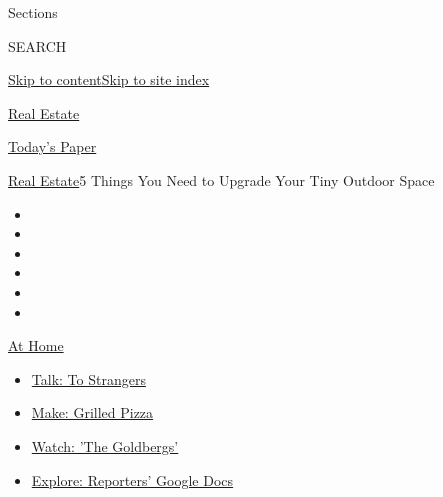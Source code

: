 Sections

SEARCH

\protect\hyperlink{site-content}{Skip to
content}\protect\hyperlink{site-index}{Skip to site index}

\href{https://www.nytimes3xbfgragh.onion/section/realestate}{Real
Estate}

\href{https://myaccount.nytimes3xbfgragh.onion/auth/login?response_type=cookie\&client_id=vi}{}

\href{https://www.nytimes3xbfgragh.onion/section/todayspaper}{Today's
Paper}

\href{/section/realestate}{Real Estate}\textbar{}5 Things You Need to
Upgrade Your Tiny Outdoor Space

\begin{itemize}
\item
\item
\item
\item
\item
\item
\end{itemize}

\href{https://www.nytimes3xbfgragh.onion/spotlight/at-home?action=click\&pgtype=Article\&state=default\&region=TOP_BANNER\&context=at_home_menu}{At
Home}

\begin{itemize}
\tightlist
\item
  \href{https://www.nytimes3xbfgragh.onion/2020/08/03/well/family/the-benefits-of-talking-to-strangers.html?action=click\&pgtype=Article\&state=default\&region=TOP_BANNER\&context=at_home_menu}{Talk:
  To Strangers}
\item
  \href{https://www.nytimes3xbfgragh.onion/2020/08/01/at-home/coronavirus-make-pizza-on-a-grill.html?action=click\&pgtype=Article\&state=default\&region=TOP_BANNER\&context=at_home_menu}{Make:
  Grilled Pizza}
\item
  \href{https://www.nytimes3xbfgragh.onion/2020/07/31/arts/television/goldbergs-abc-stream.html?action=click\&pgtype=Article\&state=default\&region=TOP_BANNER\&context=at_home_menu}{Watch:
  'The Goldbergs'}
\item
  \href{https://www.nytimes3xbfgragh.onion/interactive/2020/at-home/even-more-reporters-editors-diaries-lists-recommendations.html?action=click\&pgtype=Article\&state=default\&region=TOP_BANNER\&context=at_home_menu}{Explore:
  Reporters' Google Docs}
\end{itemize}

